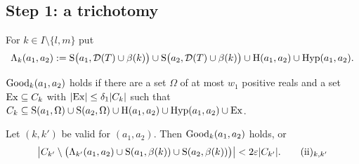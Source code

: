 \subsection{Step 1: a trichotomy}
For $k\in I\setminus\{l,m\}$ put
\[
\Lambda_k(a_1,a_2):=\mathrm{S}\bigl(a_1,\mathcal{D}(T)\cup\beta(k)\bigr)\cup\mathrm{S}\bigl(a_2,\mathcal{D}(T)\cup\beta(k)\bigr)\cup\mathrm{H}(a_1,a_2)\cup\mathrm{Hyp}(a_1,a_2).
\]

\begin{definition}[$\Good$]\label{def:good}
$\mathrm{Good}_k(a_1,a_2)$ holds if there are a set $\Omega$ of at most $w_1$ positive reals and a set $\mathrm{Ex}\subseteq C_k$
with $|\mathrm{Ex}|\le\delta_1|C_k|$ such that
$C_k\subseteq\mathrm{S}(a_1,\Omega)\cup\mathrm{S}(a_2,\Omega)\cup\mathrm{H}(a_1,a_2)\cup\mathrm{Hyp}(a_1,a_2)\cup\mathrm{Ex}$.
\end{definition}

\begin{lemma}[Step 1]\label{lem:step1}
Let $(k,k')$ be valid for $(a_1,a_2)$. Then $\mathrm{Good}_k(a_1,a_2)$ holds, or
\[
\bigl|C_{k'}\setminus\bigl(\Lambda_{k'}(a_1,a_2)\cup\Sph(a_1,\beta(k))\cup\Sph(a_2,\beta(k))\bigr)\bigr|<2\eps|C_{k'}|.
\tag*{(ii)$_{k,k'}$}
\]
\end{lemma}
